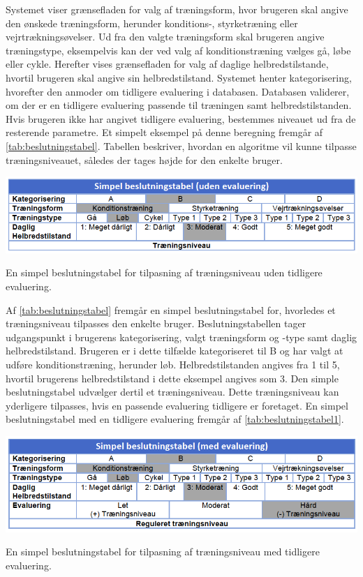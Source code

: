 \noindent
Systemet viser grænsefladen for valg af træningsform, hvor brugeren skal angive den ønskede træningsform, herunder konditions-, styrketræning eller vejrtrækningsøvelser. Ud fra den valgte træningsform skal brugeren angive træningstype, eksempelvis kan der ved valg af konditionstræning vælges gå, løbe eller cykle. Herefter vises grænsefladen for valg af daglige helbredstilstande, hvortil brugeren skal angive sin helbredstilstand. Systemet henter kategorisering, hvorefter den anmoder om tidligere evaluering i databasen. Databasen validerer, om der er en tidligere evaluering passende til træningen samt helbredstilstanden. Hvis brugeren ikke har angivet tidligere evaluering, bestemmes niveauet ud fra de resterende parametre. Et simpelt eksempel på denne beregning fremgår af \autoref{tab:beslutningstabel}. Tabellen beskriver, hvordan en algoritme vil kunne tilpasse træningsniveauet, således der tages højde for den enkelte bruger.

\begin{table}[H]
\centering
\includegraphics[width=1\textwidth]{figures/aktivitetsdiagram/beslutningstabel}
\caption{En simpel beslutningstabel for tilpasning af træningsniveau uden tidligere evaluering.}
\label{tab:beslutningstabel}
\end{table} 

\noindent
Af \autoref{tab:beslutningstabel} fremgår en simpel beslutningstabel for, hvorledes et træningsniveau tilpasses den enkelte bruger. Beslutningstabellen tager udgangspunkt i brugerens kategorisering, valgt træningsform og -type samt daglig helbredstilstand. Brugeren er i dette tilfælde kategoriseret til B og har valgt at udføre konditionstræning, herunder løb. Helbredstilstanden angives fra 1 til 5, hvortil brugerens helbredstilstand i dette eksempel angives som 3. Den simple beslutningstabel udvælger dertil et træningsniveau. Dette træningsniveau kan yderligere tilpasses, hvis en passende evaluering tidligere er foretaget. En simpel beslutningstabel med en tidligere evaluering fremgår af \autoref{tab:beslutningstabel1}.

\begin{table}[H]
\centering
\includegraphics[width=1\textwidth]{figures/aktivitetsdiagram/beslutningstabel1}
\caption{En simpel beslutningstabel for tilpasning af træningsniveau med tidligere evaluering.}
\label{tab:beslutningstabel1}
\end{table} 

